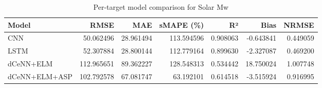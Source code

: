 \begin{table}
\caption{Per-target model comparison for Solar Mw}
\begin{tabular}{lrrrrrr}
\toprule
Model & RMSE & MAE & sMAPE (\%) & R² & Bias & NRMSE \\
\midrule
CNN & 50.062496 & 28.961494 & 113.594596 & 0.908063 & -0.643841 & 0.449059 \\
LSTM & 52.307884 & 28.800144 & 112.779164 & 0.899630 & -2.327087 & 0.469200 \\
dCeNN+ELM & 112.965651 & 89.362227 & 128.548313 & 0.534442 & 18.750024 & 1.007748 \\
dCeNN+ELM+ASP & 102.792578 & 67.081747 & 63.192101 & 0.614518 & -3.515924 & 0.916995 \\
\bottomrule
\end{tabular}
\end{table}
